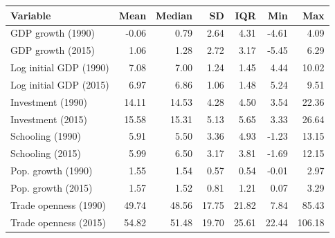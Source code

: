 
\begin{tabular}{lrrrrrr}
\toprule
Variable & Mean & Median & SD & IQR & Min & Max\\
\midrule
GDP growth (1990) & -0.06 & 0.79 & 2.64 & 4.31 & -4.61 & 4.09\\
GDP growth (2015) & 1.06 & 1.28 & 2.72 & 3.17 & -5.45 & 6.29\\
Log initial GDP (1990) & 7.08 & 7.00 & 1.24 & 1.45 & 4.44 & 10.02\\
Log initial GDP (2015) & 6.97 & 6.86 & 1.06 & 1.48 & 5.24 & 9.51\\
Investment (1990) & 14.11 & 14.53 & 4.28 & 4.50 & 3.54 & 22.36\\
\addlinespace
Investment (2015) & 15.58 & 15.31 & 5.13 & 5.65 & 3.33 & 26.64\\
Schooling (1990) & 5.91 & 5.50 & 3.36 & 4.93 & -1.23 & 13.15\\
Schooling (2015) & 5.99 & 6.50 & 3.17 & 3.81 & -1.69 & 12.15\\
Pop. growth (1990) & 1.55 & 1.54 & 0.57 & 0.54 & -0.01 & 2.97\\
Pop. growth (2015) & 1.57 & 1.52 & 0.81 & 1.21 & 0.07 & 3.29\\
\addlinespace
Trade openness (1990) & 49.74 & 48.56 & 17.75 & 21.82 & 7.84 & 85.43\\
Trade openness (2015) & 54.82 & 51.48 & 19.70 & 25.61 & 22.44 & 106.18\\
\bottomrule
\end{tabular}
